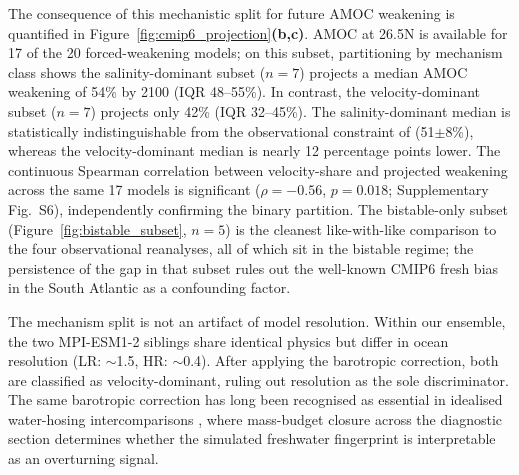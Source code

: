 \documentclass[11pt,a4paper]{article}
\begin{document}
The consequence of this mechanistic split for future AMOC weakening is quantified in Figure~\ref{fig:cmip6_projection}\textbf{(b,c)}. AMOC at 26.5\textdegree N is available for 17 of the 20 forced-weakening models; on this subset, partitioning by mechanism class shows the salinity-dominant subset (\(n=7\)) projects a median AMOC weakening of 54\% by 2100 (IQR 48--55\%). In contrast, the velocity-dominant subset (\(n=7\)) projects only 42\% (IQR 32--45\%). The salinity-dominant median is statistically indistinguishable from the observational constraint of \citet{Portmann2026} (51\(\pm\)8\%), whereas the velocity-dominant median is nearly 12 percentage points lower. The continuous Spearman correlation between velocity-share and projected weakening across the same 17 models is significant ($\rho = -0.56$, $p = 0.018$; Supplementary Fig.~S6), independently confirming the binary partition. The bistable-only subset (Figure~\ref{fig:bistable_subset}, $n=5$) is the cleanest like-with-like comparison to the four observational reanalyses, all of which sit in the bistable regime; the persistence of the gap in that subset rules out the well-known CMIP6 fresh bias in the South Atlantic as a confounding factor.

The mechanism split is not an artifact of model resolution. Within our ensemble, the two MPI-ESM1-2 siblings share identical physics but differ in ocean resolution (LR: $\sim$1.5\textdegree, HR: $\sim$0.4\textdegree). After applying the barotropic correction, both are classified as velocity-dominant, ruling out resolution as the sole discriminator. The same barotropic correction has long been recognised as essential in idealised water-hosing intercomparisons \citep{Stouffer2006}, where mass-budget closure across the diagnostic section determines whether the simulated freshwater fingerprint is interpretable as an overturning signal.
\end{document}
